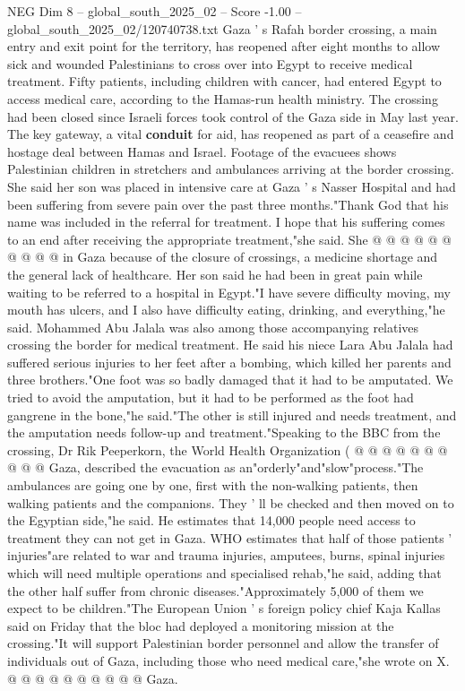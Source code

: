 \begin{textsample}{NEG Dim 8 – global\_south\_2025\_02 – Score -1.00 – global\_south\_2025\_02/120740738.txt}  \label{ex:f8_neg_369}
Gaza ' s Rafah border crossing, a main entry and exit point for the territory, has reopened after eight months to allow sick and wounded Palestinians to cross over into Egypt to receive medical treatment.
Fifty patients, including children with cancer, had entered Egypt to access medical care, according to the Hamas-run health ministry.
The crossing had been closed since Israeli forces took control of the Gaza side in May last year.
The key gateway, a vital \textbf{conduit} for aid, has reopened as part of a ceasefire and hostage deal between Hamas and Israel.
Footage of the evacuees shows Palestinian children in stretchers and ambulances arriving at the border crossing.
She said her son was placed in intensive care at Gaza ' s Nasser Hospital and had been suffering from severe pain over the past three months."Thank God that his name was included in the referral for treatment.
I hope that his suffering comes to an end after receiving the appropriate treatment,"she said.
She @ @ @ @ @ @ @ @ @ @ in Gaza because of the closure of crossings, a medicine shortage and the general lack of healthcare.
Her son said he had been in great pain while waiting to be referred to a hospital in Egypt."I have severe difficulty moving, my mouth has ulcers, and I also have difficulty eating, drinking, and everything,"he said.
Mohammed Abu Jalala was also among those accompanying relatives crossing the border for medical treatment.
He said his niece Lara Abu Jalala had suffered serious injuries to her feet after a bombing, which killed her parents and three brothers."One foot was so badly damaged that it had to be amputated.
We tried to avoid the amputation, but it had to be performed as the foot had gangrene in the bone,"he said."The other is still injured and needs treatment, and the amputation needs follow-up and treatment."Speaking to the BBC from the crossing, Dr Rik Peeperkorn, the World Health Organization ( @ @ @ @ @ @ @ @ @ @ Gaza, described the evacuation as an"orderly"and"slow"process."The ambulances are going one by one, first with the non-walking patients, then walking patients and the companions.
They ' ll be checked and then moved on to the Egyptian side,"he said.
He estimates that 14,000 people need access to treatment they can not get in Gaza.
WHO estimates that half of those patients ' injuries"are related to war and trauma injuries, amputees, burns, spinal injuries which will need multiple operations and specialised rehab,"he said, adding that the other half suffer from chronic diseases."Approximately 5,000 of them we expect to be children."The European Union ' s foreign policy chief Kaja Kallas said on Friday that the bloc had deployed a monitoring mission at the crossing."It will support Palestinian border personnel and allow the transfer of individuals out of Gaza, including those who need medical care,"she wrote on X. @ @ @ @ @ @ @ @ @ @ Gaza.

\end{textsample}
